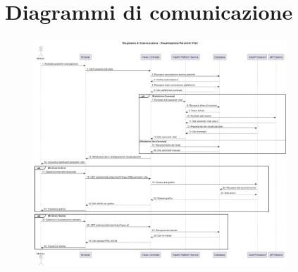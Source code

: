 \documentclass[12pt,a4paper,oneside]{report}
\begin{document}
\section{Diagrammi di comunicazione}
\begin{figure}[H]
    \centering
    \includegraphics[width=0.85\textwidth]{images/uml/VitalSignsVisualization.png}
\end{figure}
\end{document}
